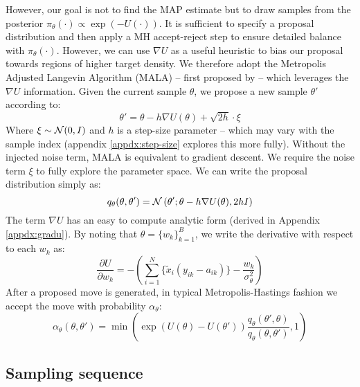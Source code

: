 However, our goal is not to find the MAP estimate but to draw samples from the posterior $\pi_\theta(\cdot) \propto \exp(-U(\cdot))$. It is sufficient to specify a proposal distribution and then apply a MH accept-reject step to ensure detailed balance with $\pi_\theta(\cdot)$. However, we can use $\nabla U$ as a useful heuristic to bias our proposal towards regions of higher target density. We therefore adopt the Metropolis Adjusted Langevin Algorithm (MALA) -- first proposed by \citet{mala-tweedie} -- which leverages the $\nabla U$ information. Given the current sample $\theta$, we propose a new sample $\theta'$ according to:
%
\begin{equation}
	\theta' = \theta - h \nabla U(\theta) + \sqrt{2h} \cdot \xi
	\label{eqn:theta-update}
\end{equation}
%
Where $\xi \sim \mathcal{N}(0, I)$ and $h$ is a step-size parameter -- which may vary with the sample index (appendix \ref{appdx:step-size} explores this more fully). Without the injected noise term, MALA is equivalent to gradient descent. We require the noise term $\xi$ to fully explore the parameter space. We can write the proposal distribution simply as:
%
\begin{equation}
	q_\theta(\theta, \theta') = \mathcal{N} \left( \theta' ; \theta - h \nabla U(\theta), 2h I \right)
\end{equation}
%
The term $\nabla U$ has an easy to compute analytic form (derived in Appendix \ref{appdx:gradu}). By noting that $\theta = \{w_k\}_{k=1}^{B}$, we write the derivative with respect to each $w_k$ as:
%
\begin{equation}
	\frac{\partial U}{\partial w_k} = - \left( \sum_{i=1}^{N} \Big\{ \tilde{x}_i (y_{ik} - a_{ik}) \Big\} - \frac{w_k}{\sigma_\theta^2} \right)
	\label{eqn:U-derivative}
\end{equation}
%
After a proposed move is generated, in typical Metropolis-Hastings fashion we accept the move with probability $\alpha_\theta$:
%
\begin{equation}
	\alpha_\theta(\theta, \theta') = \min \left( 
	\exp \left( U(\theta) - U(\theta')\right)
	\frac{ 
		q_\theta(\theta', \theta)
	}{
		q_\theta(\theta, \theta')
	} 
	, 1 \right)
\end{equation}

\subsection{Sampling sequence}

